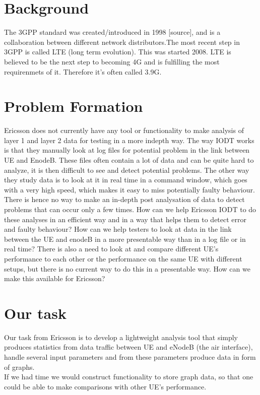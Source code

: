 \documentclass[cropmarks, frame, english]{idamasterthesis}
\begin{document}
\section{Background}
The 3GPP standard was created/introduced in 1998 [source], and is a collaboration between different network distributors.The most recent step in 3GPP is called LTE (long term evolution). This was started 2008. LTE is believed to be the next step to becoming 4G and is fulfilling the most requirenmets of it. Therefore it's often called 3.9G.
\newpage

\section{Problem Formation}
Ericsson does not currently have any tool or functionality to make analysis of layer 1 and layer 2 data for testing in a more indepth way. The way IODT works is that they manually look at log files for potential problem in the link between UE and EnodeB. These files often contain a lot of data and can be quite hard to analyze, it is then difficult to see and detect potential problems. The other way they study data is to look at it in real time in a command window, which goes with a very high speed, which makes it easy to miss potentially faulty behaviour. There is hence no way to make an in-depth post analysation of data to detect problems that can occur only a few times. How can we help Ericsson IODT to do these analyses in an efficient way and in a way that helps them to detect error and faulty behaviour? How can we help testers to look at data in the link between the UE and enodeB in a more presentable way than in a log file or in real time? There is also a need to look at and compare different UE's performance to each other or the performance on the same UE with different setups, but there is no current way to do this in a presentable way. How can we make this available for Ericsson? \newline

\section{Our task} %
Our task from Ericsson is to develop a lightweight analysis tool that simply produces statistics from data traffic between UE and eNodeB (the air interface), handle several input parameters and from these parameters produce data in form of graphs. \\
If we had time we would construct functionality to store graph data, so that one could be able to make comparisons with other UE's performance. \\
\end{document}
